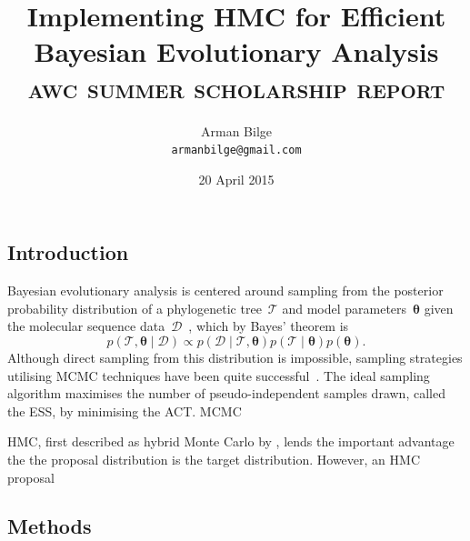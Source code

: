 \documentclass{article}
\title{Implementing \acl{HMC} for Efficient Bayesian Evolutionary Analysis \\
           \Large\textsc{awc summer scholarship report}}
\author{Arman Bilge \\ \texttt{armanbilge@gmail.com}}
\date{20 April 2015}
\renewcommand{\vec}[1]{\ensuremath{\boldsymbol{\mathbf{#1}}}}
\begin{document}
    \maketitle

    \subsection*{Introduction}

    Bayesian evolutionary analysis is centered around sampling from the
        posterior probability distribution of a phylogenetic
        tree~$\mathcal{T}$ and model parameters~$\vec\theta$
        given the molecular sequence data~$\mathcal{D}$~\cite{Bou+14},
        which by Bayes' theorem is
        \begin{equation}
            p\left(\mathcal{T}, \vec\theta \mid \mathcal{D}\right)
                \propto p\left(\mathcal{D} \mid \mathcal{T},\vec\theta\right)
                p\left(\mathcal{T} \mid \vec\theta\right) p\left(\vec\theta\right).
        \end{equation}
    Although direct sampling from this distribution is impossible, sampling
        strategies utilising \ac{MCMC} techniques have been quite
        successful~\cite{Ron+12,Dru+12,Bou+14}.
    The ideal sampling algorithm maximises the number of pseudo-independent
        samples drawn, called the \ac{ESS}, by minimising the \ac{ACT}.
    \ac{MCMC}

    \ac{HMC}, first described as hybrid Monte Carlo by \textcite{Dua+87},
        lends the important advantage the the proposal distribution is the
        target distribution.
    However, an \ac{HMC} proposal

    \subsection*{Methods}
\end{document}
